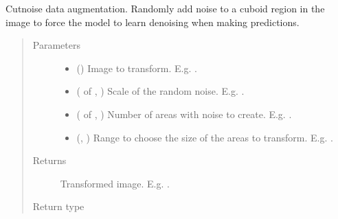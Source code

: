 \documentclass[letterpaper,10pt,english]{sphinxmanual}
\begin{document}

\begin{fulllineitems}
\label{\detokenize{data/generators/augmentors:data.generators.augmentors.cutnoise}}
Cutnoise data augmentation. Randomly add noise to a cuboid region in the image to force the model to learn
denoising when making predictions.
\begin{quote}\begin{description}
\item[{Parameters}] \leavevmode\begin{itemize}
\item {} 
 () \textendash{} Image to transform. E.g. .

\item {} 
 ( of , ) \textendash{} Scale of the random noise. E.g. .

\item {} 
 ( of , ) \textendash{} Number of areas with noise to create. E.g. .

\item {} 
 (, ) \textendash{} Range to choose the size of the areas to transform. E.g. .

\end{itemize}

\item[{Returns}] \leavevmode
{} \textendash{} Transformed image. E.g. .

\item[{Return type}] \leavevmode
{}


\end{description}
\end{quote}
\end{fulllineitems}
\end{document}
